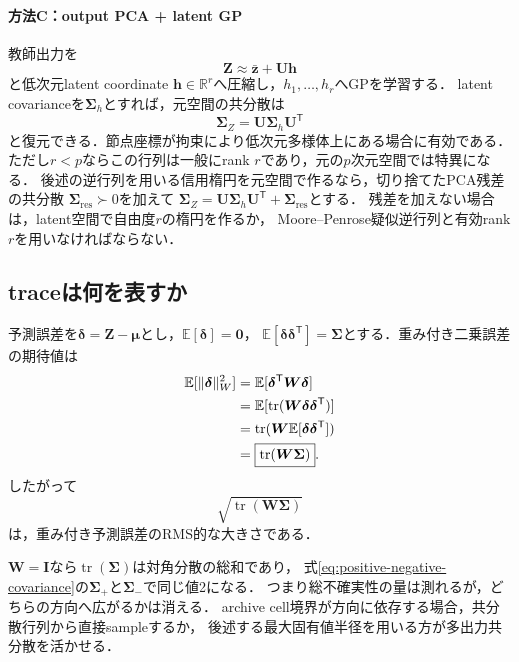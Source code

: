 \documentclass[a4paper,11pt]{ltjsarticle}
\newcommand{\E}{\mathbb E}
\newcommand{\R}{\mathbb R}
\newcommand{\I}{\bm I}
\newcommand{\T}{\mathsf T}
\newcommand{\tr}{\operatorname{tr}}
\begin{document}
\paragraph{方法C：output PCA + latent GP}
教師出力を
\begin{equation}
  \bm Z\approx\bar{\bm z}+\bm U\bm h
  \label{eq:output-pca}
\end{equation}
と低次元latent coordinate \(\bm h\in\R^r\)へ圧縮し，\(h_1,\ldots,h_r\)へGPを学習する．
latent covarianceを\(\bm\Sigma_h\)とすれば，元空間の共分散は
\begin{equation}
  \bm\Sigma_Z=\bm U\bm\Sigma_h\bm U^\T
  \label{eq:pca-output-covariance}
\end{equation}
と復元できる．節点座標が拘束により低次元多様体上にある場合に有効である．
ただし\(r<p\)ならこの行列は一般にrank \(r\)であり，元の\(p\)次元空間では特異になる．
後述の逆行列を用いる信用楕円を元空間で作るなら，切り捨てたPCA残差の共分散
\(\bm\Sigma_{\mathrm{res}}\succ0\)を加えて
\(\bm\Sigma_Z=\bm U\bm\Sigma_h\bm U^\T+\bm\Sigma_{\mathrm{res}}\)とする．
残差を加えない場合は，latent空間で自由度\(r\)の楕円を作るか，
Moore--Penrose疑似逆行列と有効rank \(r\)を用いなければならない．

\subsection{traceは何を表すか}

予測誤差を\(\bm\delta=\bm Z-\bm\mu\)とし，\(\E[\bm\delta]=\bm0\)，
\(\E[\bm\delta\bm\delta^\T]=\bm\Sigma\)とする．重み付き二乗誤差の期待値は
\begin{align}
  \E[\|\bm\delta\|_W^2]
  &=\E[\bm\delta^\T\bm W\bm\delta]\notag\\
  &=\E[\tr(\bm W\bm\delta\bm\delta^\T)]\notag\\
  &=\tr(\bm W\E[\bm\delta\bm\delta^\T])\notag\\
  &=\boxed{\tr(\bm W\bm\Sigma)}.
  \label{eq:expected-weighted-error-trace}
\end{align}
したがって
\begin{equation}
  \sqrt{\tr(\bm W\bm\Sigma)}
  \label{eq:rms-uncertainty}
\end{equation}
は，重み付き予測誤差のRMS的な大きさである．

\begin{cautionbox}[traceだけでは楕円の向きを完全には使わない]
\(\bm W=\I\)なら\(\tr(\bm\Sigma)\)は対角分散の総和であり，
式\eqref{eq:positive-negative-covariance}の\(\bm\Sigma_+\)と\(\bm\Sigma_-\)で同じ値2になる．
つまり総不確実性の量は測れるが，どちらの方向へ広がるかは消える．
archive cell境界が方向に依存する場合，共分散行列から直接sampleするか，
後述する最大固有値半径を用いる方が多出力共分散を活かせる．
\end{cautionbox}
\end{document}
